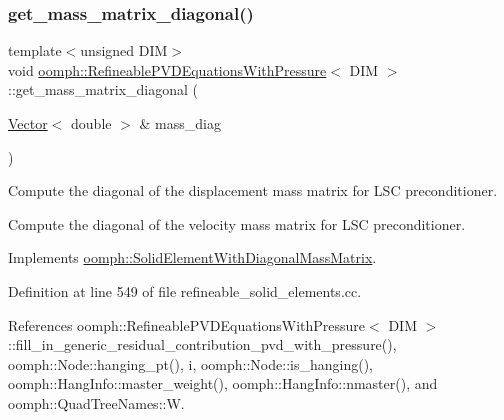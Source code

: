 \mbox{\label{classoomph_1_1RefineablePVDEquationsWithPressure_ab15495baf81c012c6569f37b5c2b1e0f}} 
\subsubsection{\texorpdfstring{get\+\_\+mass\+\_\+matrix\+\_\+diagonal()}{get\_mass\_matrix\_diagonal()}}
{\footnotesize\ttfamily template$<$unsigned D\+IM$>$ \\
void \hyperlink{classoomph_1_1RefineablePVDEquationsWithPressure}{oomph\+::\+Refineable\+P\+V\+D\+Equations\+With\+Pressure}$<$ D\+IM $>$\+::get\+\_\+mass\+\_\+matrix\+\_\+diagonal (\begin{DoxyParamCaption}\item[{\hyperlink{classoomph_1_1Vector}{Vector}$<$ double $>$ \&}]{mass\+\_\+diag }\end{DoxyParamCaption})\hspace{0.3cm}{\ttfamily [virtual]}}



Compute the diagonal of the displacement mass matrix for L\+SC preconditioner. 

Compute the diagonal of the velocity mass matrix for L\+SC preconditioner. 

Implements \hyperlink{classoomph_1_1SolidElementWithDiagonalMassMatrix_ad2335852a20987f6a6c8e0d6ce5bc3af}{oomph\+::\+Solid\+Element\+With\+Diagonal\+Mass\+Matrix}.



Definition at line 549 of file refineable\+\_\+solid\+\_\+elements.\+cc.



References oomph\+::\+Refineable\+P\+V\+D\+Equations\+With\+Pressure$<$ D\+I\+M $>$\+::fill\+\_\+in\+\_\+generic\+\_\+residual\+\_\+contribution\+\_\+pvd\+\_\+with\+\_\+pressure(), oomph\+::\+Node\+::hanging\+\_\+pt(), i, oomph\+::\+Node\+::is\+\_\+hanging(), oomph\+::\+Hang\+Info\+::master\+\_\+weight(), oomph\+::\+Hang\+Info\+::nmaster(), and oomph\+::\+Quad\+Tree\+Names\+::W.

